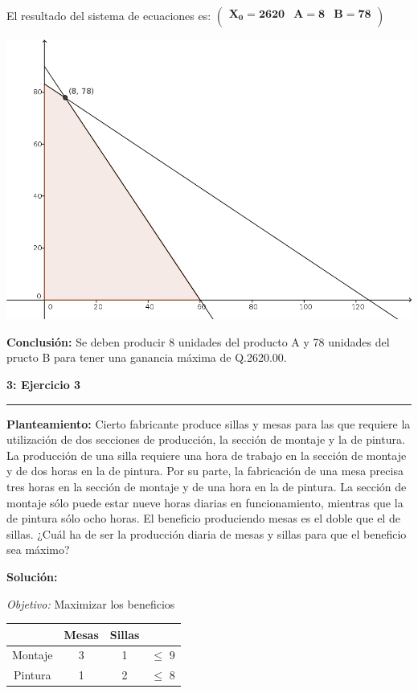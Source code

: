 \documentclass[11pt]{article}
\newcommand\problema[2]{\vspace{.01in}\textbf{#1: #2}\vspace{.5em}\hrule\vspace{.10in}}
\newcommand\planteamiento{\vspace{.10in}\textbf{Planteamiento: }}
\newcommand\solucion{\vspace{.10in}\textbf{Solución: }}
\newcommand\conclusion{\vspace{.10in}\textbf{Conclusión: }}
\newcommand\obj{\vspace{.10in}\textit{Objetivo: }}
\begin{document}
El resultado del sistema de ecuaciones es:
\begin{math}
\mathbf{\left(\begin{array}{rrr}X_0=2620&A=8&B=78\\\end{array}\right)}
\end{math}
\begin{center}
\includegraphics[scale=0.5]{parcial1src/problema1.png}
\end{center}
\conclusion Se deben producir 8 unidades del producto A y 78 unidades del pructo B para tener una ganancia máxima de Q.2620.00.

\pagebreak

\problema{3}{Ejercicio 3}
\planteamiento
Cierto fabricante produce sillas y mesas para las que requiere la utilización de dos secciones de producción, la sección de montaje y la de pintura. La producción de una silla requiere una hora de trabajo en la sección de montaje y de dos horas en la de pintura. Por su parte, la fabricación de una mesa precisa tres horas en la sección de montaje y de una hora en la de pintura. La sección de montaje sólo puede estar nueve horas diarias en funcionamiento, mientras que la de pintura sólo ocho horas. El beneficio produciendo mesas es el doble que el de sillas. ¿Cuál ha de ser la producción diaria de mesas y sillas para que el beneficio sea máximo?

\solucion

\obj Maximizar los beneficios

\begin{tabular}{c|c|c|c}
\hline 
 & Mesas & Sillas &  \\ 
\hline 
Montaje & 3 & 1 & $\leq$ 9 \\ 
\hline 
Pintura & 1 & 2 & $\leq$ 8 \\ 
\hline 
\end{tabular}
\end{document}
